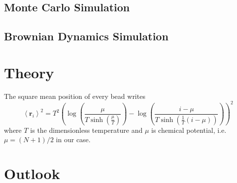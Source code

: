 \documentclass[12pt,a4paper]{article}
\begin{document}
\subsection{Monte Carlo Simulation}
\label{sub:monte_carlo_simulation}

\subsection{Brownian Dynamics Simulation}
\label{sub:brownian_dynamics_simulation}

\section{Theory}
\label{sec:theory}

The square mean position of every bead writes
\begin{equation}
	\left<\mathbf{r}_i\right>^2  = 
T^{2} \left(\log{\left (\frac{\mu}{T \sinh{\left (\frac{\mu}{T} \right )}} \right )} - \log{\left (\frac{i - \mu}{T \sinh{\left (\frac{1}{T} \left(i - \mu\right) \right )}} \right )}\right)^{2}
\end{equation}
where $T$ is the dimensionless temperature and $\mu$ is chemical potential, i.e.
$\mu = (N+1)/2$ in our case.

\section{Outlook}
\label{sec:outlook}



 
\end{document}
